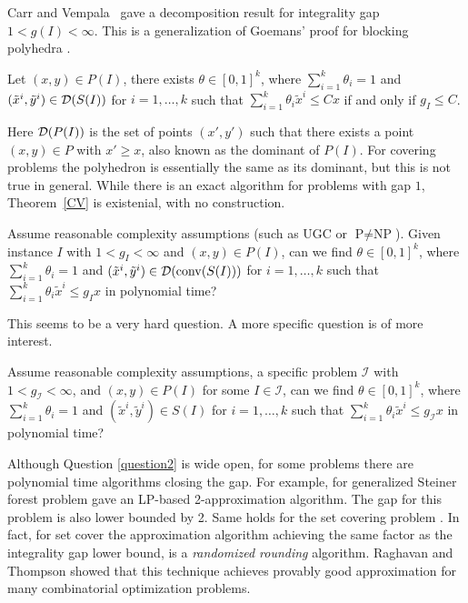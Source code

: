 Carr and Vempala~\cite{CV} gave a decomposition result for integrality gap $1<g(I)<\infty$. %
This is a generalization of Goemans' proof for blocking polyhedra \cite{goemans}. 

\begin{theorem} \label{CV}
	Let $(x,y)\in P(I)$, there exists $\theta \in [0,1]^k$, where $\sum_{i=1}^{k}\theta_i =1$ and $(\tilde{x}^i,\tilde{y}^i)\in \operatorname{\mathcal{D}}(S(I))$ for $i=1,\ldots,k$ such that $\sum_{i=1}^{k}\theta_i \tilde{x}^i\leq Cx$ if and only if $g_I \leq C$.
\end{theorem}
Here $\operatorname{\mathcal{D}}(P(I))$ is the set of points $(x',y')$ such that there exists a point $(x,y)\in P$ with $x'\geq x$, also known as the dominant of $P(I)$. For covering problems the polyhedron is essentially the same as its dominant, but this is not true in general. While there is an exact algorithm for problems with gap $1$, Theorem~\ref{CV} is existenial, with no construction.
\iffalse

\begin{question*}\label{question1}
	Assume reasonable complexity assumptions (such as UGC or $\textrm{P}\neq \textrm{NP}$). Given instance $I$ with $1<g_I<\infty$ and $(x,y)\in P(I)$, can we find $\theta \in [0,1]^k$, where $\sum_{i=1}^{k}\theta_i =1$ and $(\tilde{x}^i,\tilde{y}^i)\in \operatorname{\mathcal{D}}(\operatorname{conv}(S(I)))$ for $i=1,\ldots,k$ such that $\sum_{i=1}^{k}\theta_i \tilde{x}^i\leq g_Ix$ in polynomial time?
\end{question*}

This seems to be a very hard question. A more specific question is of more interest.

\begin{question}\label{question2}
	Assume reasonable complexity assumptions, a specific problem $\mathcal{I}$ with  $1<g_{\mathcal{I}}<\infty$, and $(x,y)\in P(I)$ for some $I\in \mathcal{I}$, can we find $\theta \in [0,1]^k$, where $\sum_{i=1}^{k}\theta_i =1$ and $(\tilde{x}^i,\tilde{y}^i)\in S(I)$ for $i=1,\ldots,k$ such that $\sum_{i=1}^{k}\theta_i \tilde{x}^i\leq g_{\mathcal{I}}x$ in polynomial time?
\end{question}
Although Question \ref{question2} is wide open, for some problems there are polynomial time algorithms closing the gap. For example, for generalized Steiner forest problem \cite{jain} gave an LP-based 2-approximation algorithm. The gap for this problem is also lower bounded by 2. Same holds for the set covering problem \cite{randomizedrounding}. In fact, for set cover the approximation algorithm achieving the same factor as the integrality gap lower bound, is a \textit{randomized rounding} algorithm. Raghavan and Thompson \cite{randomizedrounding} showed that this technique achieves provably good approximation for many combinatorial optimization problems.  

